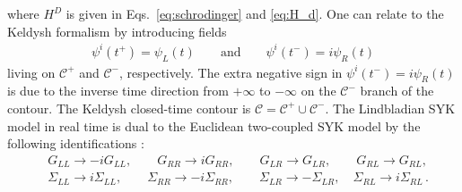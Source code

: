 where $H^D$ is given in Eqs.~\eqref{eq:schrodinger} and \eqref{eq:H_d}. One can relate to the Keldysh formalism by introducing fields 
\begin{align}
   \psi^i(t^+)=\psi_L(t) \qquad \mathrm{and} \qquad \psi^i(t^-)=i\psi_R(t)
\end{align}  
living on $\mathcal{C}^+$ and $\mathcal{C}^-$, respectively. The extra negative sign in $\psi^i(t^-)=i\psi_R(t)$ is due to the inverse time direction from $+\infty$ to $-\infty$ on the $\mathcal{C}^-$ branch of the contour. The Keldysh closed-time contour is $\mathcal{C}=\mathcal{C}^+ \cup \mathcal{C}^-$. The Lindbladian SYK model in real time is dual to the Euclidean two-coupled SYK model by the following identifications \cite{garcia2023keldysh}:
\begin{align}
    &G_{LL}\rightarrow -i G_{LL},\qquad G_{RR}\rightarrow i G_{RR},\qquad G_{LR} \rightarrow G_{LR}, \qquad G_{RL}\rightarrow G_{RL}, \nonumber \\
    &\Sigma_{LL}\rightarrow i \Sigma_{LL},\qquad \Sigma_{RR}\rightarrow -i \Sigma_{RR},\qquad \Sigma_{LR}\rightarrow -\Sigma_{LR},\quad \Sigma_{RL}\rightarrow i \Sigma_{RL}\,.
\end{align}


